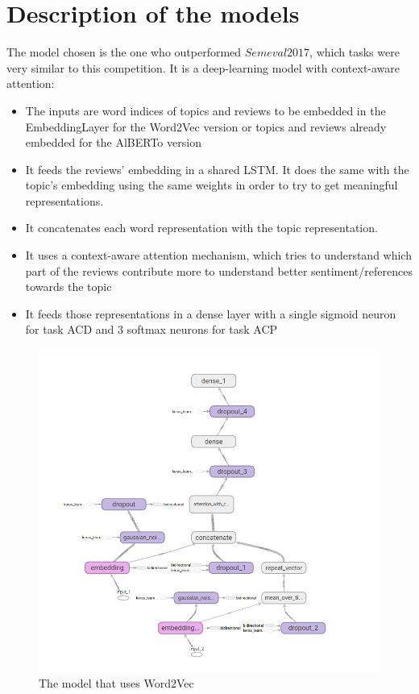 \documentclass{article}
\begin{document}
    \section{Description of the models}\label{sec:s3}
        The model chosen is the one who outperformed $Semeval2017$, which tasks were very similar to this competition.
        It is a deep-learning model with context-aware attention:
        \begin{itemize}
            \item The inputs are word indices of topics and reviews to be embedded in the EmbeddingLayer for the Word2Vec version or topics and reviews already embedded for the AlBERTo version
            \item It feeds the reviews' embedding in a shared LSTM. It does the same with the topic's embedding using the same weights in order to try to get meaningful representations.
            \item It concatenates each word representation with the topic representation.
            \item It uses a context-aware attention mechanism, which tries to understand which part of the reviews contribute more to understand better sentiment/references towards the topic
            \item It feeds those representations in a dense layer with a single sigmoid neuron for task ACD and 3 softmax neurons for task ACP
        \end{itemize}
        \begin{figure}
            \includegraphics[width=\linewidth]{w2v_model.png}
            \caption{The model that uses Word2Vec}
            \label{fig:w2v_model}
        \end{figure}
\end{document}
